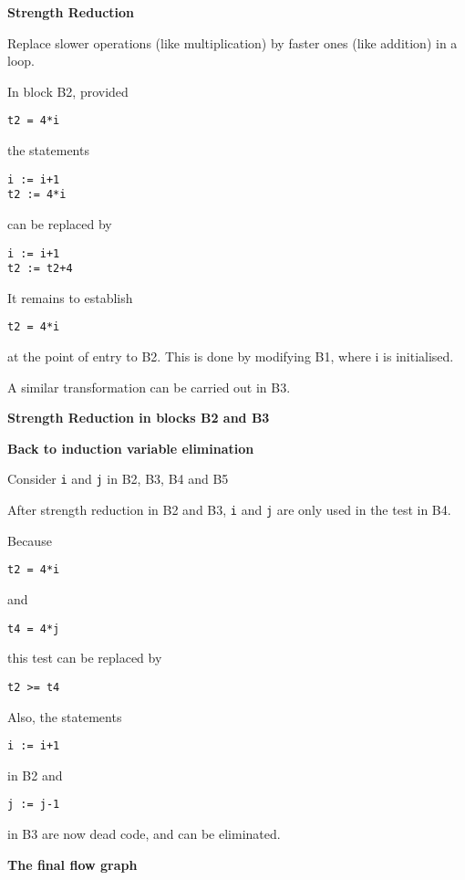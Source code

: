%
%
\begin{slide}{}
{\small
{\bf Strength Reduction}

Replace slower operations (like multiplication) by faster ones (like addition) in a loop.

In block B2, provided
\begin{verbatim}
t2 = 4*i
\end{verbatim}
the statements 
\begin{verbatim}
i := i+1
t2 := 4*i
\end{verbatim}
can be replaced by
\begin{verbatim}
i := i+1
t2 := t2+4
\end{verbatim}

It remains to establish 
\begin{verbatim}
t2 = 4*i
\end{verbatim}
at the point of entry to B2.  This is done by modifying B1, where i
is initialised.

A similar transformation can be carried out in B3.
}
\end{slide}

%
%
\begin{slide}{}
{\bf Strength Reduction in blocks B2 and B3}

\vspace{3ex}
\end{slide}
%
%
\begin{slide}{}
{\small
{\bf Back to induction variable elimination}

Consider {\tt i} and {\tt j} in B2, B3, B4 and B5

After strength reduction in B2 and B3, {\tt i} and {\tt j} are
only used in the test in B4.

Because
\begin{verbatim}
t2 = 4*i
\end{verbatim}
and
\begin{verbatim}
t4 = 4*j
\end{verbatim}
this test can be replaced by
\begin{verbatim}
t2 >= t4
\end{verbatim}

Also, the statements
\begin{verbatim}
i := i+1
\end{verbatim}
in B2
and 
\begin{verbatim}
j := j-1
\end{verbatim}
in B3
are now dead code, and can be eliminated.
}
\end{slide}
%
%
\begin{slide}{}
{\bf The final flow graph}

\vspace{3ex}
\end{slide}

